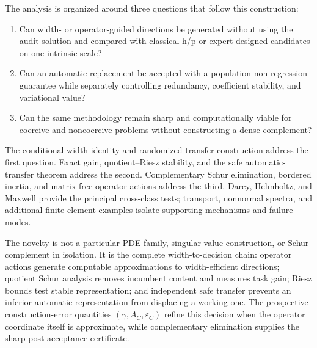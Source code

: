 \documentclass[11pt]{article}
\numberwithin{algorithm}{section}
\theoremstyle{definition}\newtheorem{definition}[theorem]{Definition}
\theoremstyle{remark}\newtheorem{remark}[theorem]{Remark}
\begin{document}
The analysis is organized around three questions that follow this construction:
\begin{enumerate}
\item Can width- or operator-guided directions be generated without using the
audit solution and compared with classical h/p or expert-designed candidates
on one intrinsic scale?
\item Can an automatic replacement be accepted with a population
non-regression guarantee while separately controlling redundancy, coefficient
stability, and variational value?
\item Can the same methodology remain sharp and computationally viable for
coercive and noncoercive problems without constructing a dense complement?
\end{enumerate}

The conditional-width identity and randomized transfer construction address
the first question.  Exact gain, quotient--Riesz stability, and the safe
automatic-transfer theorem address the second.  Complementary Schur
elimination, bordered inertia, and matrix-free operator actions address the
third.  Darcy, Helmholtz, and Maxwell provide the principal cross-class tests;
transport, nonnormal spectra, and additional finite-element examples isolate
supporting mechanisms and failure modes.

The novelty is not a particular PDE family, singular-value construction, or
Schur complement in isolation.  It is the complete width-to-decision chain:
operator actions generate computable approximations to width-efficient
directions; quotient Schur analysis removes incumbent content and measures
task gain; Riesz bounds test stable representation; and independent safe transfer
prevents an inferior automatic representation from displacing a working one.
The prospective construction-error quantities $(\gamma,A_C,\varepsilon_C)$
refine this decision when the operator coordinate itself is approximate, while
complementary elimination supplies the sharp post-acceptance certificate.
\end{document}
